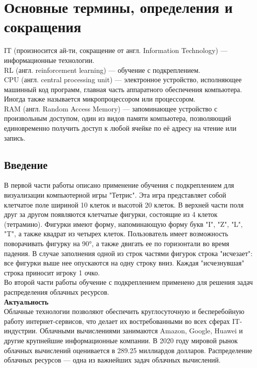 \documentclass{article}
\begin{document}
\section {Основные термины, определения и сокращения}
IT (произносится ай-ти, сокращение от англ. Information Technology) — информационные технологии.\\
RL (англ. reinforcement learning) — обучение с подкреплением.\\
CPU (англ. central processing unit) — электронное устройство, исполняющее машинный код программ, главная часть аппаратного обеспечения компьютера. Иногда также называется микропроцессором или процессором.\\
RAM (англ. Random Access Memory) — запоминающее устройство с произвольным доступом, один из видов памяти компьютера, позволяющий единовременно получить доступ к любой ячейке по её адресу на чтение или запись.
\newpage
\begin{center}
\section {Введение}
\end{center}
В первой части работы описано применение обучения с подкреплением для визуализации компьютерной игры "Тетрис"\cite{litlink8}. Эта игра представляет собой клетчатое поле шириной 10 клеток и высотой 20 клеток. В верхней части поля друг за другом появляются клетчатые фигурки, состоящие из 4 клеток (тетрамино). Фигурки имеют форму, напоминающую форму букв "I", "Z", "L", "T", а также квадрат из четырех клеток. Пользователь имеет возможность поворачивать фигурку на 90°, а также двигать ее по горизонтали во время падения. В случае заполнения одной из строк частями фигурок строка "исчезает": все фигурки выше нее опускаются на одну строку вниз. Каждая "исчезнувшая" строка приносит игроку 1 очко.\\
Во второй части работы обучение с подкреплением применено для решения задач распределения облачных ресурсов.\\
\textbf{Актуальность}\\
Облачные технологии позволяют обеспечить круглосуточную и бесперебойную работу интернет-сервисов, что делает их востребованными во всех сферах IT-индустрии. Облачными вычислениями занимаются Amazon, Google, Huawei и другие крупнейшие информационные компании\cite{litlink2}\cite{litlink12}. В 2020 году мировой рынок облачных вычислений оценивается в 289.25 миллиардов долларов\cite{litlink11}. Распределение облачных ресурсов — одна из важнейших задач облачных вычислений.\\
\end{document}
